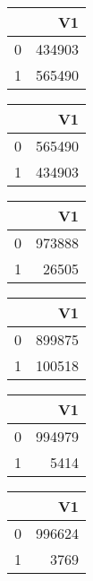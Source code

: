 \bigskip\bigskip
\centering
\begin{tabular}{rr}
  \hline
 & V1 \\ 
  \hline
0 & 434903 \\ 
  1 & 565490 \\ 
   \hline
\end{tabular}

\bigskip\bigskip
\centering
\begin{tabular}{rr}
  \hline
 & V1 \\ 
  \hline
0 & 565490 \\ 
  1 & 434903 \\ 
   \hline
\end{tabular}

\bigskip\bigskip
\centering
\begin{tabular}{rr}
  \hline
 & V1 \\ 
  \hline
0 & 973888 \\ 
  1 & 26505 \\ 
   \hline
\end{tabular}

\bigskip\bigskip
\centering
\begin{tabular}{rr}
  \hline
 & V1 \\ 
  \hline
0 & 899875 \\ 
  1 & 100518 \\ 
   \hline
\end{tabular}

\bigskip\bigskip
\centering
\begin{tabular}{rr}
  \hline
 & V1 \\ 
  \hline
0 & 994979 \\ 
  1 & 5414 \\ 
   \hline
\end{tabular}

\bigskip\bigskip
\centering
\begin{tabular}{rr}
  \hline
 & V1 \\ 
  \hline
0 & 996624 \\ 
  1 & 3769 \\ 
   \hline
\end{tabular}

